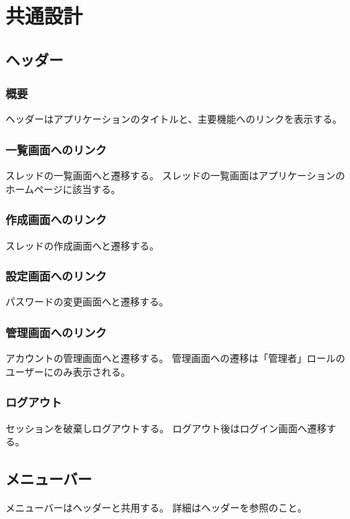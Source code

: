 \chapter{共通設計}
    \section{ヘッダー}
        \subsection{概要}
            ヘッダーはアプリケーションのタイトルと、主要機能へのリンクを表示する。

        \subsection{一覧画面へのリンク}
            スレッドの一覧画面へと遷移する。
            スレッドの一覧画面はアプリケーションのホームページに該当する。

        \subsection{作成画面へのリンク}
            スレッドの作成画面へと遷移する。

        \subsection{設定画面へのリンク}
            パスワードの変更画面へと遷移する。

        \subsection{管理画面へのリンク}
            アカウントの管理画面へと遷移する。
            管理画面への遷移は「管理者」ロールのユーザーにのみ表示される。

        \subsection{ログアウト}
            セッションを破棄しログアウトする。
            ログアウト後はログイン画面へ遷移する。

    \section{メニューバー}
        メニューバーはヘッダーと共用する。
        詳細はヘッダーを参照のこと。


